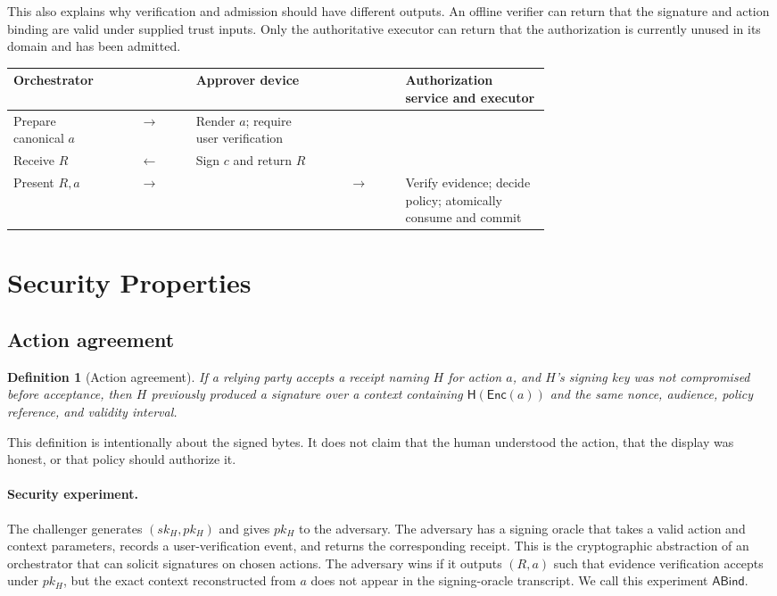 \documentclass[10.5pt]{article}
\newtheorem{definition}{Definition}
\newcommand{\Enc}{\mathsf{Enc}}
\newcommand{\Hash}{\mathsf{H}}
\begin{document}
This also explains why verification and admission should have different outputs.
An offline verifier can return that the signature and action binding are valid
under supplied trust inputs. Only the authoritative executor can return that the
authorization is currently unused in its domain and has been admitted.

\begin{center}
\setlength{\tabcolsep}{6pt}
\begin{tabular}{>{\raggedright\arraybackslash}p{0.19\linewidth}c>{\raggedright\arraybackslash}p{0.24\linewidth}c>{\raggedright\arraybackslash}p{0.27\linewidth}}
\toprule
Orchestrator & & Approver device & & Authorization service and executor \\
\midrule
Prepare canonical $a$ & $\longrightarrow$ & Render $a$; require user verification & & \\
Receive $R$ & $\longleftarrow$ & Sign $c$ and return $R$ & & \\
Present $R,a$ & $\longrightarrow$ & & $\longrightarrow$ & Verify evidence; decide policy; atomically consume and commit \\
\bottomrule
\end{tabular}
\end{center}

\section{Security Properties}

\subsection{Action agreement}

\begin{definition}[Action agreement]
If a relying party accepts a receipt naming $H$ for action $a$, and $H$'s signing
key was not compromised before acceptance, then $H$ previously produced a
signature over a context containing $\Hash(\Enc(a))$ and the same nonce, audience,
policy reference, and validity interval.
\end{definition}

This definition is intentionally about the signed bytes. It does not claim that
the human understood the action, that the display was honest, or that policy
should authorize it.

\paragraph{Security experiment.}
The challenger generates $(sk_H,pk_H)$ and gives $pk_H$ to the adversary. The
adversary has a signing oracle that takes a valid action and context parameters,
records a user-verification event, and returns the corresponding receipt. This is
the cryptographic abstraction of an orchestrator that can solicit signatures on
chosen actions. The adversary wins if it outputs $(R,a)$ such that evidence
verification accepts under $pk_H$, but the exact context reconstructed from $a$
does not appear in the signing-oracle transcript. We call this experiment
$\mathsf{ABind}$.
\end{document}
